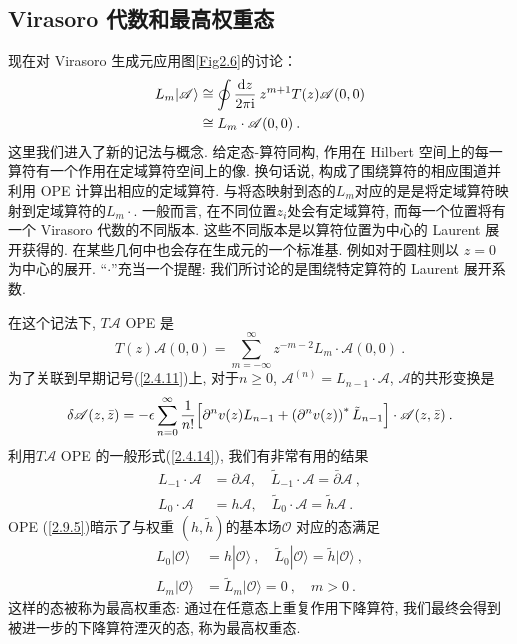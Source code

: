\subsection*{Virasoro 代数和最高权重态}

现在对 Virasoro 生成元应用图\ref{Fig2.6}的讨论：
\begin{align}
L_{m}\lvert \mathscr{A}\rangle & \cong \oint \frac{\mathrm{d} z}{2 \pi \mathrm{i}}\: z^{m+1} T(z) \mathscr{A}(0,0)  \nonumber \\
& \cong L_{m} \cdot \mathscr{A}(0,0) \:. \label{2.9.4}
\end{align}
这里我们进入了新的记法与概念. 给定态-算符同构, 作用在 Hilbert 空间上的每一算符有一个作用在定域算符空间上的像. 换句话说, 构成了围绕算符的相应围道并利用 OPE 计算出相应的定域算符. 与将态映射到态的$L_m$对应的是是将定域算符映射到定域算符的$L_m\cdot$. 一般而言, 在不同位置$z_i$处会有定域算符, 而每一个位置将有一个 Virasoro 代数的不同版本. 这些不同版本是以算符位置为中心的 Laurent 展开获得的. 在某些几何中也会存在生成元的一个标准基. 例如对于圆柱则以 $z=0$ 为中心的展开. “$\cdot$”充当一个提醒: 我们所讨论的是围绕特定算符的 Laurent 展开系数. 

在这个记法下, $T\mathscr{A}$ OPE 是
\begin{equation}\label{2.9.5}
T(z) \mathscr{A}(0,0)=\sum_{m=-\infty}^{\infty} z^{-m-2} L_{m} \cdot \mathscr{A}(0,0) \:. 
\end{equation}
为了关联到早期记号(\ref{2.4.11})上, 对于$n \geq 0$, $\mathscr{A}^{(n)}=L_{n-1} \cdot \mathscr{A}$, $\mathscr{A}$的共形变换是
\begin{equation}
\delta \mathscr{A}(z, \bar{z})=-\epsilon \sum_{n=0}^{\infty} \frac{1}{n !}\Bigl[\partial^{n} v(z) L_{n-1}+\left(\partial^{n} v(z)\right)^{*} \tilde{L}_{n-1}\Bigr] \cdot \mathscr{A}(z, \bar{z}) \:. \label{2.9.6}
\end{equation}
利用$T\mathscr{A}$ OPE 的一般形式(\ref{2.4.14}), 我们有非常有用的结果
\begin{subequations}\label{2.9.7}
\begin{align}
L_{-1} \cdot \mathscr{A}&=\partial \mathscr{A}, \quad \tilde{L}_{-1} \cdot \mathscr{A}=\bar{\partial} \mathscr{A} \:, \label{2.9.7a} \\
L_{0} \cdot \mathscr{A}&=h \mathscr{A}, \quad \tilde{L}_{0} \cdot \mathscr{A}=\tilde{h} \mathscr{A} \:.\label{2.9.7b}
\end{align}
\end{subequations}
OPE (\ref{2.9.5})暗示了与权重 $(h, \tilde{h})$的基本场$\mathcal{O}$ 对应的态满足
\begin{subequations} \label{2.9.8}
\begin{align}
L_{0}|\mathcal{O}\rangle&=h|\mathcal{O}\rangle \:, \quad \tilde{L}_{0}|\mathcal{O}\rangle=\tilde{h}|\mathcal{O}\rangle \:, \label{2.9.8a} \\
L_{m}|\mathcal{O}\rangle&=\tilde{L}_{m}|\mathcal{O}\rangle=0\:, \quad m>0 \:. \label{2.9.8b}
\end{align}
\end{subequations}
这样的态被称为最高权重态: 通过在任意态上重复作用下降算符, 我们最终会得到被进一步的下降算符湮灭的态, 称为最高权重态. 

